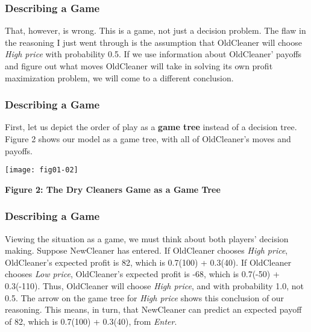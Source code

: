  \begin{frame}[fragile]\frametitle{Describing a Game}
That, however, is wrong.  This is a game, not  just a decision problem.  The
flaw in the reasoning I just went through is the assumption that OldCleaner will
choose {\it High price} with probability 0.5. If we use information about
OldCleaner' payoffs and figure out what moves OldCleaner will take  in solving
its own profit maximization problem, we will come to a different conclusion.


\end{frame}

 \begin{frame}[fragile]\frametitle{Describing a Game}
First, let us depict the order of play as a {\bf game tree} instead of  a
decision tree.  Figure  2 shows our model as a game tree, with all of
OldCleaner's moves and payoffs.




\texttt{[image: fig01-02]}

\begin{center} {\bf Figure  2:   The Dry Cleaners Game as a Game  Tree }
\end{center}


\end{frame}

 \begin{frame}[fragile]\frametitle{Describing a Game}
Viewing the situation as a game, we must think about both players' decision
making.  Suppose NewCleaner has entered. If OldCleaner chooses {\it High price},
OldCleaner's expected profit is  82, which is 0.7(100) + 0.3(40).   If
OldCleaner  chooses {\it  Low  price}, OldCleaner's expected profit is   -68,
which is 0.7(-50) + 0.3(-110). Thus, OldCleaner will choose  {\it High price},
and with probability 1.0, not 0.5. The arrow on the game tree for {\it High
price} shows this conclusion of our reasoning.  This means, in turn,  that
NewCleaner can predict an expected payoff of   82, which is 0.7(100) + 0.3(40),
from {\it Enter}.

\end{frame}

